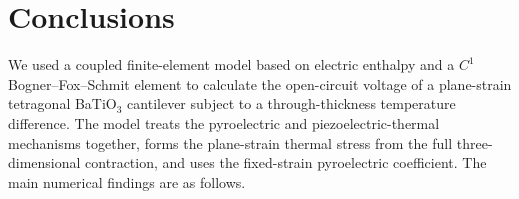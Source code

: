 \documentclass[a4paper,12pt]{elsarticle}
\begin{document}
\section{Conclusions}
\label{sec:conclusions}

We used a coupled finite-element model based on electric enthalpy
and a $C^1$ Bogner--Fox--Schmit element to calculate the open-circuit
voltage of a plane-strain tetragonal BaTiO$_3$ cantilever subject to a
through-thickness temperature difference. The model treats the pyroelectric and piezoelectric-thermal mechanisms
together, forms the plane-strain thermal stress from the full three-dimensional
contraction, and uses the fixed-strain pyroelectric coefficient. The main numerical findings are as follows.
\end{document}
